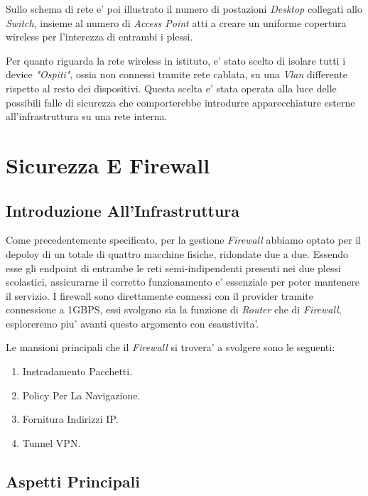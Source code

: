\documentclass{report}
\begin{document}
\begin{sloppypar}
        Sullo schema di rete e' poi illustrato il numero di postazioni \emph{Desktop} collegati allo \emph{Switch}, 
         insieme al numero di \emph{Access Point} atti a creare un uniforme copertura wireless per l'interezza di
         entrambi i plessi.

        Per quanto riguarda la rete wireless in istituto, e' stato scelto di isolare tutti i device \textit{"Ospiti"}, ossia
         non connessi tramite rete cablata, su una \emph{Vlan} differente rispetto al resto dei dispositivi. Questa scelta 
         e' stata operata alla luce delle possibili falle di sicurezza che comporterebbe introdurre apparecchiature 
         esterne all'infrastruttura su una rete interna.
    \end{sloppypar}
    \chapter{Sicurezza E Firewall}
        \author{Serena Thomas}
        \section{Introduzione All'Infrastruttura}
        Come precedentemente specificato, per la gestione \emph{Firewall} abbiamo optato per il depoloy di un totale di
         quattro macchine fisiche, ridondate due a due. Essendo esse gli endpoint di entrambe le reti semi-indipendenti 
         presenti nei due plessi scolastici, assicurarne il corretto funzionamento e' essenziale per poter mantenere
         il servizio.
        I firewall sono direttamente connessi con il provider tramite connessione a 1GBPS, essi svolgono sia la funzione 
         di \emph{Router} che di \emph{Firewall}, esploreremo piu' avanti questo argomento con esaustivita'.

        Le mansioni principali che il \emph{Firewall} si trovera' a svolgere sono le seguenti:
        \begin{enumerate}
            \item Instradamento Pacchetti.
            \item Policy Per La Navigazione.
            \item Fornitura Indirizzi IP.
            \item Tunnel VPN.
        \end{enumerate}
        \section{Aspetti Principali}
\end{document}
